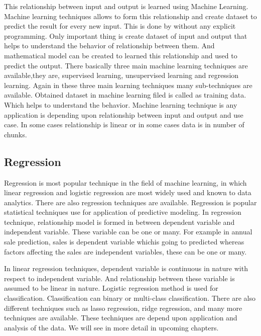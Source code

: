 \par This relationship between input and output is learned using Machine Learning. Machine learning techniques allows to form this relationship and create dataset to predict the result for every new input. This is done by without any explicit programming. Only important thing is create dataset of input and output that helps to understand the behavior of relationship between them. And mathematical model can be created to learned this relationship and used to predict the output. There basically three main machine learning techniques are available,they are, supervised learning, unsupervised learning and regression learning. Again in these three main learning techniques many sub-techniques are available. Obtained dataset in machine learning filed is called as training data. Which helps to understand the behavior. Machine learning technique is any application is depending upon relationship between input and output and use case. In some cases relationship is linear or in some cases data is in number of chunks.

\subsection{Regression}
Regression is most popular technique in the field of machine learning, in which linear regression and logistic regression are most widely used and known to data analytics.  There are also regression techniques are available. Regression is popular statistical techniques use for application of predictive modeling. In regression technique, relationship model is formed in between dependent variable and independent variable. These variable can be one or many. For example in annual sale prediction, sales is dependent variable whichis going to predicted whereas factors affecting the sales are independent variables, these can be one or many. 

\par In linear regression techniques, dependent variable is continuous in nature with respect to independent variable. And relationship between these variable is assumed to be linear in nature. Logistic regression method is used for classification. Classification can binary or multi-class classification. There are also different techniques such as lasso regression, ridge regression, 
and many more techniques are available. These techniques are depend upon application and analysis of the data. We will see in more detail in upcoming chapters.








